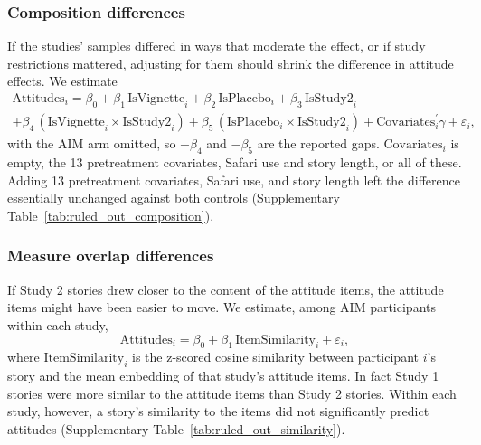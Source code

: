 \documentclass[11pt]{article}
\begin{document}
{\footnotesize

}

\subsubsection{Composition differences}
\label{sec:si-composition-differences}

If the studies' samples differed in ways that moderate the effect, or if study restrictions mattered, adjusting for them should shrink the difference in attitude effects. We estimate
\begin{multline*}
\text{Attitudes}_i = \beta_0 + \beta_1\,\text{IsVignette}_i + \beta_2\,\text{IsPlacebo}_i
+ \beta_3\,\text{IsStudy2}_i \\
+ \beta_4\,(\text{IsVignette}_i \times \text{IsStudy2}_i)
+ \beta_5\,(\text{IsPlacebo}_i \times \text{IsStudy2}_i)
+ \text{Covariates}_i^{\prime}\gamma + \varepsilon_i,
\end{multline*}
with the AIM arm omitted, so $-\beta_4$ and $-\beta_5$ are the reported gaps. $\text{Covariates}_i$ is empty, the 13 pretreatment covariates, Safari use and story length, or all of these. Adding 13 pretreatment covariates, Safari use, and story length left the difference essentially unchanged against both controls (Supplementary Table~\ref{tab:ruled_out_composition}).

{\footnotesize

}

\subsubsection{Measure overlap differences}
\label{sec:si-measure-overlap}

If Study 2 stories drew closer to the content of the attitude items, the attitude items might have been easier to move. We estimate, among AIM participants within each study,
\begin{equation*}
\text{Attitudes}_i = \beta_0 + \beta_1\,\text{ItemSimilarity}_i + \varepsilon_i,
\end{equation*}
where $\text{ItemSimilarity}_i$ is the z-scored cosine similarity between participant $i$'s story and the mean embedding of that study's attitude items. In fact Study 1 stories were more similar to the attitude items than Study 2 stories. Within each study, however, a story's similarity to the items did not significantly predict attitudes (Supplementary Table~\ref{tab:ruled_out_similarity}).
\end{document}
